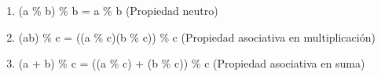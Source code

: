 
\begin{enumerate}
\item (a \% b) \% b = a \% b (Propiedad neutro)
\item (ab) \% c = ((a \% c)(b \% c)) \% c (Propiedad asociativa en multiplicaci\'on)
\item (a + b) \% c = ((a \% c) + (b \% c)) \% c (Propiedad asociativa en suma)
\end{enumerate}

